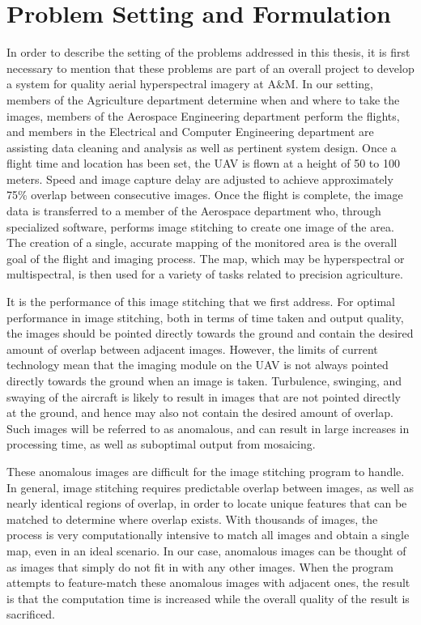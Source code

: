 \section{Problem Setting and Formulation}

In order to describe the setting of the problems addressed in this thesis, it is first necessary to mention that these problems are part of an overall project to develop a system for quality aerial hyperspectral imagery at A\&M.
In our setting, members of the Agriculture department determine when and where to take the images, members of the Aerospace Engineering department perform the flights, and members in the Electrical and Computer Engineering department are assisting data cleaning and analysis as well as pertinent system design.
Once a flight time and location has been set, the UAV is flown at a height of 50 to 100 meters.
Speed and image capture delay are adjusted to achieve approximately 75\% overlap between consecutive images.
Once the flight is complete, the image data is transferred to a member of the Aerospace department who, through specialized software, performs image stitching to create one image of the area.
The creation of a single, accurate mapping of the monitored area is the overall goal of the flight and imaging process.
The map, which may be hyperspectral or multispectral, is then used for a variety of tasks related to precision agriculture.

It is the performance of this image stitching that we first address.
For optimal performance in image stitching, both in terms of time taken and output quality, the images should be pointed directly towards the ground and contain the desired amount of overlap between adjacent images.
However, the limits of current technology mean that the imaging module on the UAV is not always pointed directly towards the ground when an image is taken.
Turbulence, swinging, and swaying of the aircraft is likely to result in images that are not pointed directly at the ground, and hence may also not contain the desired amount of overlap.
Such images will be referred to as anomalous, and can result in large increases in processing time, as well as suboptimal output from mosaicing.

These anomalous images are difficult for the image stitching program to handle.
In general, image stitching requires predictable overlap between images, as well as nearly identical regions of overlap, in order to locate unique features that can be matched to determine where overlap exists.
With thousands of images, the process is very computationally intensive to match all images and obtain a single map, even in an ideal scenario.
In our case, anomalous images can be thought of as images that simply do not fit in with any other images.
When the program attempts to feature-match these anomalous images with adjacent ones, the result is that the computation time is increased while the overall quality of the result is sacrificed.

